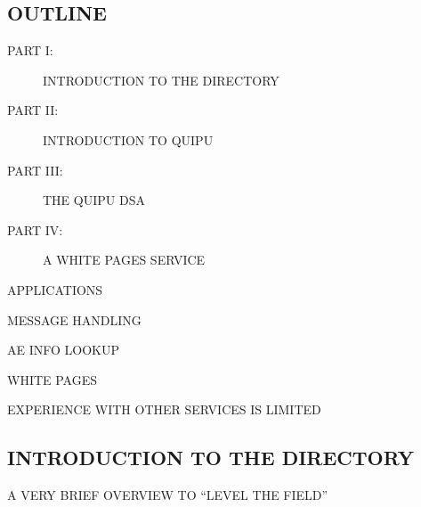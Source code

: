 

\begin{bwslide}
\part*	{OUTLINE}\bf

\begin{description}
\item[PART I:]		INTRODUCTION TO THE DIRECTORY

\item[PART II:]		INTRODUCTION TO QUIPU

\item[PART III:]	THE QUIPU DSA

\item[PART IV:]		A WHITE PAGES SERVICE
\end{description}
\end{bwslide}


\begin{bwslide}

\begin{nrtc}
\item	APPLICATIONS
    \begin{nrtc}
    \item	MESSAGE HANDLING

    \item	AE INFO LOOKUP

    \item	WHITE PAGES
    \end{nrtc}

\item	EXPERIENCE WITH OTHER SERVICES IS LIMITED
\end{nrtc}
\end{bwslide}


\begin{bwslide}
\part	{INTRODUCTION TO THE DIRECTORY}\bf

\begin{nrtc}
\item	A VERY BRIEF OVERVIEW TO ``LEVEL THE FIELD''
\end{nrtc}
\end{bwslide}


